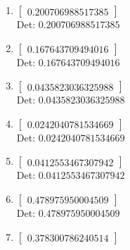 \documentclass[12pt]{article}
\begin{document}
\begin{enumerate}

\item $\displaystyle \left[\begin{matrix}0.200706988517385\end{matrix}\right]$\\

Det: $0.200706988517385$\\

\item $\displaystyle \left[\begin{matrix}0.167643709494016\end{matrix}\right]$\\

Det: $0.167643709494016$\\

\item $\displaystyle \left[\begin{matrix}0.0435823036325988\end{matrix}\right]$\\

Det: $0.0435823036325988$\\

\item $\displaystyle \left[\begin{matrix}0.0242040781534669\end{matrix}\right]$\\

Det: $0.0242040781534669$\\

\item $\displaystyle \left[\begin{matrix}0.0412553467307942\end{matrix}\right]$\\

Det: $0.0412553467307942$\\

\item $\displaystyle \left[\begin{matrix}0.478975950004509\end{matrix}\right]$\\

Det: $0.478975950004509$\\

\item $\displaystyle \left[\begin{matrix}0.378300786240514\end{matrix}\right]$\\


\end{enumerate}
\end{document}
